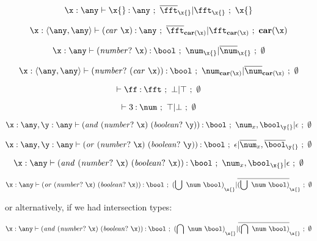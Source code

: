 \documentclass{article}[12pt]
\begin{document}
\begin{displaymath}
  \hastyvar[\xenvtop]{\x{}}{\topty}{\x{}}
\end{displaymath}

\begin{displaymath}
  \hastyvar[{\xenv{\consty{\topty}{\topty}}{}}]{\carx{}}{\topty}{\pecarx{}}
\end{displaymath}

\begin{displaymath}
  \hastypred [\xenvtop] {\numpx} {\num} {\x{}}
\end{displaymath}

\begin{displaymath}
  \hastypred [\xenv{\consty{\topty}{\topty}}] {\nump{\carx}} {\num} {\pecarx}
\end{displaymath}

\begin{displaymath}
  \hastyfalse[\empty]{\ff}{\fft}
\end{displaymath}

\begin{displaymath}
  \hastytrue[\empty]{3}{\num}
\end{displaymath}

\begin{displaymath}
  \hastyeff[\xyenv] {\cand{\numpx}{\boolpy}} {\bool} {\num_{x{}},\bool_{\y{}}}  {\bullet} {\noeffect}
\end{displaymath}

\begin{displaymath}
  \hastyeff[\xyenv] {\cor{\numpx}{\boolpy}} {\bool} {\bullet} {\comp{\num}_{x{}},\comp{\bool}_{\y{}}}  {\noeffect}
\end{displaymath}

\begin{displaymath}
  \hastyeff[\xenvtop] {\cand{\numpx}{\boolpx}} {\bool} {\num_{x{}},\bool_{\x{}}}  {\bullet} {\noeffect}
\end{displaymath}

\begin{displaymath}
  \hastypred[\xenvtop] {\cor{\numpx}{\boolpx}} {\numbool} {\x{}}
\end{displaymath}

or alternatively, if we had intersection types:

\begin{displaymath}
  \hastypred[\xenvtop] {\cand{\numpx}{\boolpx}} {\inumbool} {\x{}}
\end{displaymath}

\newpage
\end{document}

